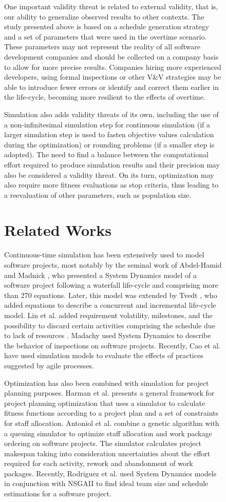 \documentclass[conference]{IEEEtran}
\begin{document}
\begin{figure}
One important validity threat is related to external validity, that is, our ability to generalize observed results to other contexts. The study presented above is based on a schedule generation strategy and a set of parameters that were used in the overtime scenario. These parameters may not represent the reality of all software development companies and should be collected on a company basis to allow for more precise results. Companies hiring more experienced developers, using formal inspections or other V\&V strategies may be able to introduce fewer errors or identify and correct them earlier in the life-cycle, becoming more resilient to the effects of overtime.

Simulation also adds validity threats of its own, including the use of a non-infinitesimal simulation step for continuous simulation (if a larger simulation step is used to fasten objective values calculation during the optimization) or rounding problems (if a smaller step is adopted). The need to find a balance between the computational effort required to produce simulation results and their precision may also be considered a validity threat. On its turn, optimization may also require more fitness evaluations as stop criteria, thus leading to a reevaluation of other parameters, such as population size.

\section{Related Works}

Continuous-time simulation has been extensively used to model software projects, most notably by the seminal work of Abdel-Hamid and Madnick \cite{Abdel-Hamid:1991}, who presented a System Dynamics model of a software project following a waterfall life-cycle and comprising more than 270 equations. Later, this model was extended by Tvedt \cite{Tvedt:1996}, who added equations to describe a concurrent and incremental life-cycle model. Lin et al. added requirement volatility, milestones, and the possibility to discard certain activities comprising the schedule due to lack of resources \cite{Lin:1997}. Madachy \cite{Madachy:1996} used System Dynamics to describe the behavior of inspections on software projects. Recently, Cao et al. \cite{Cao:2010} have used simulation models to evaluate the effects of practices suggested by agile processes.

Optimization has also been combined with simulation for project planning purposes. Harman et al. \cite{harman:2009} presents a general framework for project planning optimization that uses a simulator to calculate fitness functions according to a project plan and a set of constraints for staff allocation. Antoniol et al. \cite{Antoniol:2004} combine a genetic algorithm with a queuing simulator to optimize staff allocation and work package ordering on software projects. The simulator calculates project makespan taking into consideration uncertainties about the effort required for each activity, rework and abandonment of work packages. Recently, Rodriguez et al. \cite{Rodriguez:2011} used System Dynamics models in conjunction with NSGAII to find ideal team size and schedule estimations for a software project.


\end{figure}
\end{document}
